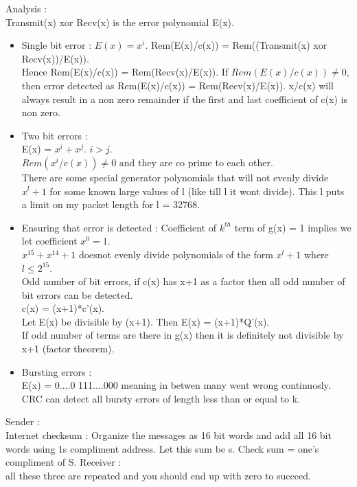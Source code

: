 \documentclass[solution,addpoints,12pt]{exam}
\begin{document}
Analysis :\\
Transmit(x) xor Recv(x) is the error polynomial E(x).\\
\begin{itemize}
\item Single bit error :
$E(x) = x^i$.
Rem(E(x)/c(x)) = Rem((Transmit(x) xor Recv(x))/E(x)).\\
Hence Rem(E(x)/c(x)) = Rem(Recv(x)/E(x)).
If $Rem(E(x)/c(x)) \ne 0$, then error detected as
Rem(E(x)/c(x)) = Rem(Recv(x)/E(x)).
x/c(x) will always result in a non zero remainder if the first
and last coefficient of c(x) is non zero.
\item Two bit errors :\\
E(x) = $x^i + x^j$. $i > j$.\\
$Rem(x^i/c(x)) \ne 0$ and they are co prime
to each other.\\
There are some special generator polynomials that
will not evenly divide $x^l + 1$ for some known large values of l
(like till l it wont divide).
This l puts a limit on my packet length for l = 32768.
\item
Ensuring that error is detected : Coefficient of $k^{th}$ term
of g(x) = 1 implies we let coefficient $x^0 = 1$.\\
$x^{15} + x^{14} + 1$ doesnot evenly divide polynomials
of the form $x^l + 1$ where $l \le 2^15$.\\
Odd number of bit errors, if c(x) has x+1 as a factor then all odd number
of bit errors can be detected.\\
c(x) = (x+1)*c'(x).\\
Let E(x) be divisible by (x+1).
Then E(x) = (x+1)*Q'(x).\\
If odd number of terms are there in g(x) then it is definitely
not divisible by x+1 (factor theorem).\\
\item
Bursting errors :\\
E(x) = 0....0 111....000 meaning in betwen many went wrong continuosly.
CRC can detect all bursty errors of length less than or equal to k.\\
\end{itemize}
Sender :\\
Internet checksum : Organize the messages as 16 bit words
and add all 16 bit words using 1s compliment address. Let this sum be s.
Check sum = one's compliment of S.
Receiver :\\
all these three are repeated and you should end up with zero to
succeed.\\
\end{document}
